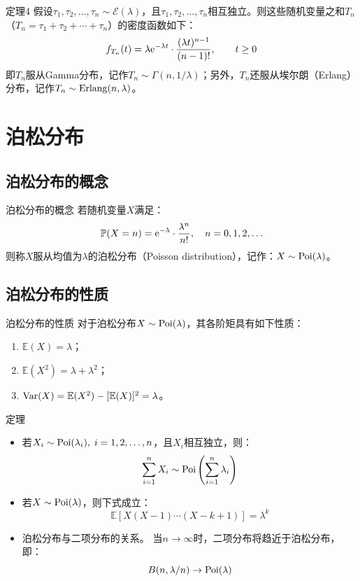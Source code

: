 \documentclass[t]{beamer}
\renewcommand{\Pr}{\mathbb{P}}
\newcommand{\E}{\mathbb{E}}
\begin{document}
\begin{frame}{定理4}
    假设$\tau_1,\tau_2,\ldots,\tau_n\sim \mathcal{E}(\lambda)$，且$\tau_1,\tau_2,\ldots,\tau_n$相互独立。则这些随机变量之和$T_n$（$T_n=\tau_1+\tau_2+\cdots+\tau_n$）的密度函数如下：
	\[f_{T_n}(t)=\lambda {\rm e}^{-\lambda t}\cdot\frac{(\lambda t)^{n-1}}{(n-1)!},\qquad t\ge 0 \]
	即$T_n$服从Gamma分布，记作$T_n\sim \Gamma(n,1/\lambda)$；另外，$T_n$还服从埃尔朗（Erlang）分布，记作$T_n\sim {\rm Erlang}(n,\lambda)$。
\end{frame}


\section{泊松分布}


\subsection{泊松分布的概念}
\begin{frame}{泊松分布的概念}
    若随机变量$X$满足：
\begin{equation*}\Pr(X=n)={\rm e}^{-\lambda}\cdot\frac{\lambda^n}{n!}, \quad n=0,1,2,\ldots 
\end{equation*}
则称$X$服从均值为$\lambda$的泊松分布（Poisson distribution），记作：$X\sim {\rm Poi}(\lambda)$。
\end{frame}

\subsection{泊松分布的性质}
\begin{frame}{泊松分布的性质}
    对于泊松分布$X\sim {\rm Poi}(\lambda)$，其各阶矩具有如下性质：
\begin{enumerate}
	\item $\E(X)=\lambda$；
	\item $\E(X^2)=\lambda+\lambda^2$；
	\item ${\rm Var}(X)=\E(X^2)-[\E(X)]^2=\lambda$。
\end{enumerate}
\end{frame}


\begin{frame}{定理}
    \begin{itemize}
        \item 若$X_i\sim {\rm Poi}(\lambda_i),\;i=1,2,\ldots,n$，且$X_i$相互独立，则：
        \begin{equation*}
        \sum_{i=1}^{n}X_i\sim {\rm Poi}\left(\sum_{i=1}^{n}\lambda_i\right) 
        \end{equation*}

        \item 若$X\sim {\rm Poi}(\lambda)$，则下式成立：
        \begin{equation*}
        \E[X(X-1)\cdots(X-k+1)]=\lambda^k
        \end{equation*}
        \item 泊松分布与二项分布的关系。
        当$n\to\infty$时，二项分布将趋近于泊松分布，即：$$B(n,\lambda/n)\to {\rm Poi}(\lambda)$$
    \end{itemize}
\end{frame}
\end{document}
